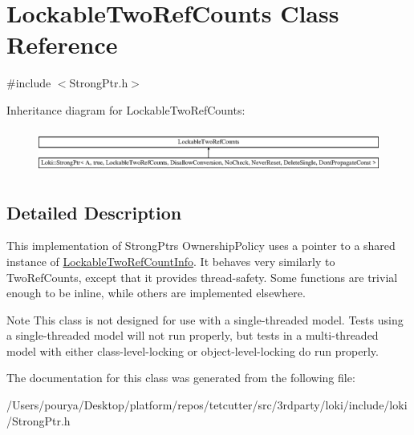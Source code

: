 \hypertarget{classLockableTwoRefCounts}{}\section{Lockable\+Two\+Ref\+Counts Class Reference}
\label{classLockableTwoRefCounts}


{\ttfamily \#include $<$Strong\+Ptr.\+h$>$}

Inheritance diagram for Lockable\+Two\+Ref\+Counts\+:\begin{figure}[H]
\begin{center}
\leavevmode
\includegraphics[height=1.456437cm]{classLockableTwoRefCounts}
\end{center}
\end{figure}


\subsection{Detailed Description}
This implementation of Strong\+Ptr\textquotesingle{}s Ownership\+Policy uses a pointer to a shared instance of \hyperlink{classLockableTwoRefCountInfo}{Lockable\+Two\+Ref\+Count\+Info}. It behaves very similarly to Two\+Ref\+Counts, except that it provides thread-\/safety. Some functions are trivial enough to be inline, while others are implemented elsewhere.

\begin{DoxyNote}{Note}
This class is not designed for use with a single-\/threaded model. Tests using a single-\/threaded model will not run properly, but tests in a multi-\/threaded model with either class-\/level-\/locking or object-\/level-\/locking do run properly. 
\end{DoxyNote}


The documentation for this class was generated from the following file\+:\begin{DoxyCompactItemize}
\item 
/\+Users/pourya/\+Desktop/platform/repos/tetcutter/src/3rdparty/loki/include/loki/Strong\+Ptr.\+h\end{DoxyCompactItemize}
